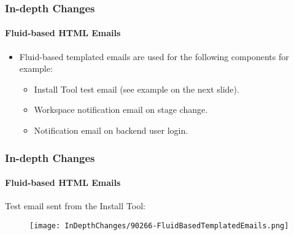 
\begin{frame}[fragile]
	\frametitle{In-depth Changes}
	\framesubtitle{Fluid-based HTML Emails}

	\begin{itemize}
		\item Fluid-based templated emails are used for the following components for example:

			\begin{itemize}
				\item Install Tool test email (see example on the next slide).
				\item Workspace notification email on stage change.
				\item Notification email on backend user login.
			\end{itemize}

	\end{itemize}

\end{frame}


\begin{frame}[fragile]
	\frametitle{In-depth Changes}
	\framesubtitle{Fluid-based HTML Emails}

	Test email sent from the Install Tool:

	\begin{figure}
		\texttt{[image: InDepthChanges/90266-FluidBasedTemplatedEmails.png]}
	\end{figure}

\end{frame}


